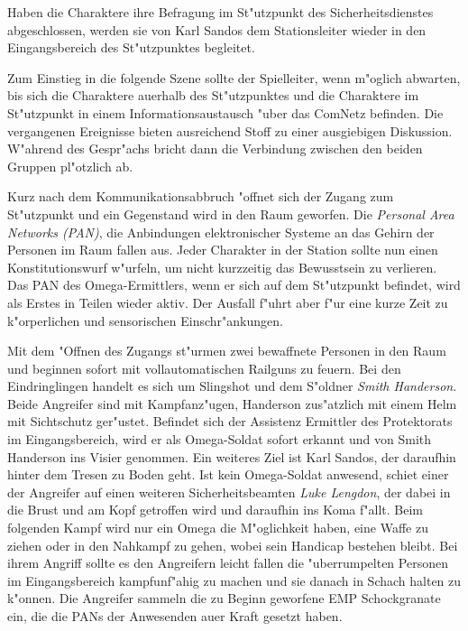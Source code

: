 
Haben die Charaktere ihre Befragung im St"utzpunkt des Sicherheitsdienstes abgeschlossen, werden sie von Karl Sandos dem Stationsleiter wieder in den Eingangsbereich des St"utzpunktes begleitet. 

Zum Einstieg in die folgende Szene sollte der Spielleiter, wenn m"oglich abwarten, bis sich die Charaktere au\3erhalb des St"utzpunktes und die Charaktere im St"utzpunkt in einem Informationsaustausch "uber das ComNetz befinden. Die vergangenen Ereignisse bieten ausreichend Stoff zu einer ausgiebigen Diskussion. W"ahrend des Gespr"achs bricht dann die Verbindung zwischen den beiden Gruppen pl"otzlich ab. 



Kurz nach dem Kommunikationsabbruch "offnet sich der Zugang zum St"utzpunkt und ein Gegenstand wird in den Raum geworfen. Die \emph{Personal Area Networks (PAN)}, die Anbindungen elektronischer Systeme an das Gehirn der Personen im Raum fallen aus. Jeder Charakter in der Station sollte nun einen Konstitutionswurf w"urfeln, um nicht kurzzeitig das Bewusstsein zu verlieren. Das PAN des Omega-Ermittlers, wenn er sich auf dem St"utzpunkt befindet, wird als Erstes in Teilen wieder aktiv. Der Ausfall f"uhrt aber f"ur eine kurze Zeit zu k"orperlichen und sensorischen Einschr"ankungen.

Mit dem "Offnen des Zugangs st"urmen zwei bewaffnete Personen in den Raum und beginnen sofort mit vollautomatischen Railguns zu feuern. Bei den Eindringlingen handelt es sich um Slingshot und dem S"oldner \emph{Smith Handerson}. Beide Angreifer sind mit Kampfanz"ugen, Handerson zus"atzlich mit einem Helm mit Sichtschutz ger"ustet. Befindet sich der Assistenz Ermittler des Protektorats im Eingangsbereich, wird er als Omega-Soldat sofort erkannt und von Smith Handerson ins Visier genommen. Ein weiteres Ziel ist Karl Sandos, der daraufhin hinter dem Tresen zu Boden geht. Ist kein Omega-Soldat anwesend, schie\3t einer der Angreifer auf einen weiteren Sicherheitsbeamten \emph{Luke Lengdon}, der dabei in die Brust und am Kopf getroffen wird und daraufhin ins Koma f"allt. Beim folgenden Kampf wird nur ein Omega die M"oglichkeit haben, eine Waffe zu ziehen oder in den Nahkampf zu gehen, wobei sein Handicap bestehen bleibt. Bei ihrem Angriff sollte es den Angreifern leicht fallen die "uberrumpelten Personen im Eingangsbereich kampfunf"ahig zu machen und sie danach in Schach halten zu k"onnen. Die Angreifer sammeln die zu Beginn geworfene EMP Schockgranate ein, die die PANs der Anwesenden au\3er Kraft gesetzt haben.

